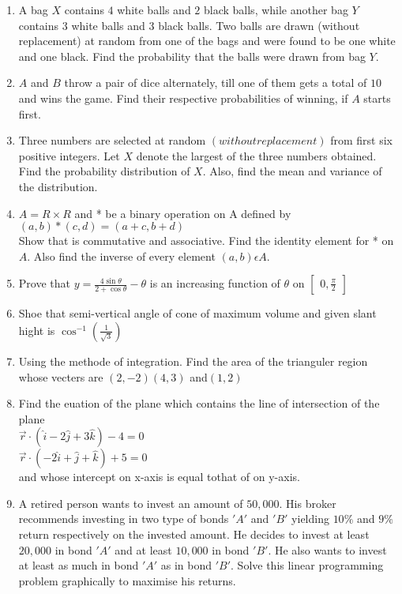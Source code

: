 \documentclass[12pt,-letter paper]{article}
\providecommand{\myvec}[1]{\ensuremath{\begin{bmatrix}#1\end{bmatrix}}}
\providecommand{\brak}[1]{\ensuremath{\left(#1\right)}}
\begin{document}
\begin{enumerate}
	\item A bag $X$ contains $4$ white balls and $2$ black balls, while another bag $Y$ contains $3$ white balls and $3$ black balls. Two balls are drawn (without replacement) at random from one of the bags and were found to be one white and one black. Find the probability that the balls were drawn from bag $Y$.
	\item  $A$ and $B$ throw a pair of dice alternately, till one of them gets a total of $10$ and wins the game. Find their respective probabilities of winning, if $A$ starts first.
	\item Three numbers are selected at random \brak{without replacement} from first six positive integers. Let $X$ denote the largest of the three numbers obtained. Find the probability distribution of $X$. Also, find the mean and variance of the distribution.
	\item $A=R \times R$ and * be a binary operation on A defined by $\brak{a,b}*\brak{c,d}=\brak{a+c,b+d}$\\
		Show that is commutative and associative. Find the identity element for * on $A$. Also find the inverse of every element $\brak{a, b} \epsilon A$.
	\item Prove that $y=\frac{4\sin{\theta}}{2+\cos{\theta}}-\theta$ is an increasing function of $\theta$ on $\myvec{0,\frac{\pi}{2}}$
	\item	Shoe that semi-vertical angle of cone of maximum volume and given slant hight is $\cos^{-1}\brak{\frac{1}{\sqrt{3}}}$
	\item Using the methode of integration. Find the area of the trianguler region whose vecters are $\brak{2, -2}\brak{4, 3}$ and$\brak{1, 2}$

\item Find the euation of the plane which contains the line of intersection of the plane \\
	$\overset\rightarrow{r}\cdot\brak{\hat{i}-2\hat{j}+3\hat{k}}-4=0$\\
	$\overset\rightarrow{r}\cdot\brak{-2\hat{	i}+\hat{j}+\hat{k}}+5=0$\\
	and whose intercept on x-axis is equal tothat of on y-axis.
	\item A retired person wants to invest an amount of \rupee $50,000$. His broker recommends investing in two type of bonds $'A'$ and $'B'$ yielding $10\%$ and $9\%$ return respectively on the invested amount. He decides to invest at least\rupee $20,000$ in bond $'A'$ and at least \rupee $10,000$ in bond $'B'$. He also wants to invest at least as much in bond $'A'$ as in bond $'B'$. Solve this linear programming problem graphically to maximise his returns.


\end{enumerate}
\end{document}
